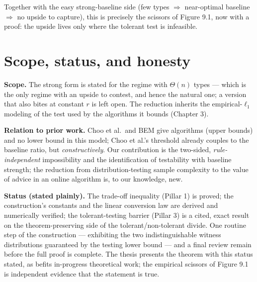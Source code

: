 Together with the easy strong-baseline side (few types \(\Rightarrow\)
near-optimal baseline \(\Rightarrow\) no upside to capture), this is
precisely the scissors of Figure 9.1, now with a proof: the upside lives
only where the tolerant test is infeasible.

\section{Scope, status, and honesty}

\textbf{Scope.} The strong form is stated for the regime with
\(\Theta(n)\) types --- which is the only regime with an upside to
contest, and hence the natural one; a version that also bites at
constant \(r\) is left open. The reduction inherits the
empirical-\(\ell_1\) modeling of the test used by the algorithms it
bounds (Chapter 3).

\textbf{Relation to prior work.} Choo et al.~and BEM give algorithms
(upper bounds) and no lower bound in this model; Choo et al.'s threshold
already couples to the baseline ratio, but \emph{constructively}. Our
contribution is the two-sided, \emph{rule-independent} impossibility and
the identification of testability with baseline strength; the reduction
from distribution-testing sample complexity to the value of advice in an
online algorithm is, to our knowledge, new.

\textbf{Status (stated plainly).} The trade-off inequality (Pillar 1) is
proved; the construction's constants and the linear conversion law are
derived and numerically verified; the tolerant-testing barrier (Pillar
3) is a cited, exact result on the theorem-preserving side of the
tolerant/non-tolerant divide. One routine step of the construction ---
exhibiting the two indistinguishable witness distributions guaranteed by
the testing lower bound --- and a final review remain before the full
proof is complete. The thesis presents the theorem with this status
stated, as befits in-progress theoretical work; the empirical scissors
of Figure 9.1 is independent evidence that the statement is true.
